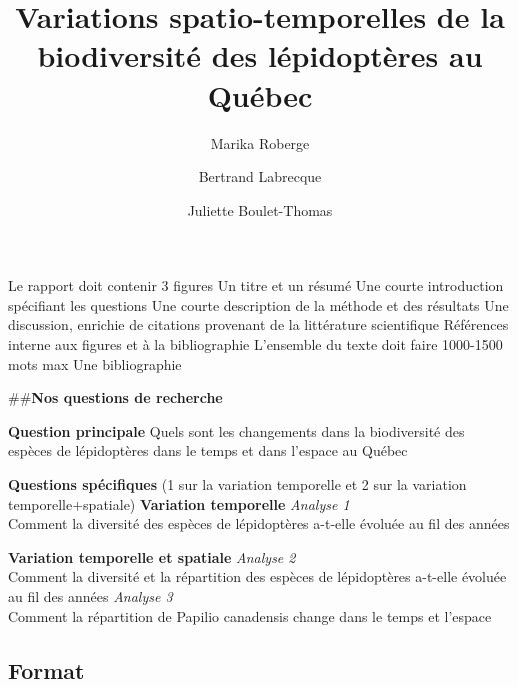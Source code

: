 \documentclass[9pt,twocolumn,twoside,]{pnas-new}
\title{Variations spatio-temporelles de la biodiversité des lépidoptères
au Québec}
\author[a]{Marika Roberge}
\author[a]{Bertrand Labrecque}
\author[a]{Juliette Boulet-Thomas}
\affil[a]{Faculté des sciences, Département de biologie, 2500
Boulevard de l'Université, Sherbrooke, Québec, J1K 2R1}
\begin{document}
\verticaladjustment{-2pt}



\maketitle
\thispagestyle{firststyle}


\acknow{}

Le rapport doit contenir 3 figures Un titre et un résumé Une courte
introduction spécifiant les questions Une courte description de la
méthode et des résultats Une discussion, enrichie de citations provenant
de la littérature scientifique Références interne aux figures et à la
bibliographie L'ensemble du texte doit faire 1000-1500 mots max Une
bibliographie

\#\#\textbf{Nos questions de recherche}

\textbf{Question principale} Quels sont les changements dans la
biodiversité des espèces de lépidoptères dans le temps et dans l'espace
au Québec

\textbf{Questions spécifiques} (1 sur la variation temporelle et 2 sur
la variation temporelle+spatiale) \textbf{Variation temporelle}
\emph{Analyse 1}\\
Comment la diversité des espèces de lépidoptères a-t-elle évoluée au fil
des années

\textbf{Variation temporelle et spatiale} \emph{Analyse 2}\\
Comment la diversité et la répartition des espèces de lépidoptères
a-t-elle évoluée au fil des années \emph{Analyse 3}\\
Comment la répartition de Papilio canadensis change dans le temps et
l'espace

\subsection*{Format}\label{format}
\end{document}
